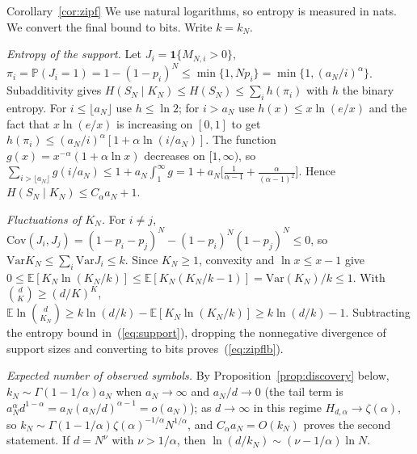 \documentclass[anon]{alt2027}
\newcommand{\E}{\mathbb{E}}
\newcommand{\Prob}{\mathbb{P}}
\renewcommand{\eqref}[1]{(\ref{#1})}
\begin{document}
\begin{proofof}{Corollary~\ref{cor:zipf}}
We use natural logarithms, so entropy is measured in nats. We convert the final bound to bits. Write $k=k_N$.\par\emph{Entropy of the support.} Let $J_i=\mathbf 1\{M_{N,i}>0\}$, $\pi_i=\Prob(J_i=1)=1-(1-p_i)^N\le\min\{1,Np_i\}=\min\{1,(a_N/i)^\alpha\}$. Subadditivity gives $H(S_N\mid K_N)\le H(S_N)\le\sum_ih(\pi_i)$ with $h$ the binary entropy. For $i\le\lfloor a_N\rfloor$ use $h\le\ln2$; for $i>a_N$ use $h(x)\le x\ln(e/x)$ and the fact that $x\ln(e/x)$ is increasing on $[0,1]$ to get $h(\pi_i)\le(a_N/i)^\alpha[1+\alpha\ln(i/a_N)]$. The function $g(x)=x^{-\alpha}(1+\alpha\ln x)$ decreases on $[1,\infty)$, so $\sum_{i>\lfloor a_N\rfloor}g(i/a_N)\le1+a_N\int_1^\infty g=1+a_N\bigl[\frac1{\alpha-1}+\frac{\alpha}{(\alpha-1)^2}\bigr]$. Hence $H(S_N\mid K_N)\le C_\alpha a_N+1$.\par\emph{Fluctuations of $K_N$.} For $i\ne j$, $\mathrm{Cov}(J_i,J_j)=(1-p_i-p_j)^N-(1-p_i)^N(1-p_j)^N\le0$, so $\mathrm{Var}K_N\le\sum_i\mathrm{Var}J_i\le k$. Since $K_N\ge1$, convexity and $\ln x\le x-1$ give $0\le\E[K_N\ln(K_N/k)]\le\E[K_N(K_N/k-1)]=\mathrm{Var}(K_N)/k\le1$. With $\binom dK\ge(d/K)^K$, $\E\ln\binom d{K_N}\ge k\ln(d/k)-\E[K_N\ln(K_N/k)]\ge k\ln(d/k)-1$. Subtracting the entropy bound in~\eqref{eq:support}, dropping the nonnegative divergence of support sizes and converting to bits proves~\eqref{eq:zipflb}.

\emph{Expected number of observed symbols.} By Proposition~\ref{prop:discovery} below, $k_N\sim\Gamma(1-1/\alpha)a_N$ when $a_N\to\infty$ and $a_N/d\to0$ (the tail term is $a_N^\alpha d^{1-\alpha}=a_N(a_N/d)^{\alpha-1}=o(a_N)$); as $d\to\infty$ in this regime $H_{d,\alpha}\to\zeta(\alpha)$, so $k_N\sim\Gamma(1-1/\alpha)\zeta(\alpha)^{-1/\alpha}N^{1/\alpha}$, and $C_\alpha a_N=O(k_N)$ proves the second statement. If $d=N^\nu$ with $\nu>1/\alpha$, then $\ln(d/k_N)\sim(\nu-1/\alpha)\ln N$.
\end{proofof}
\end{document}
